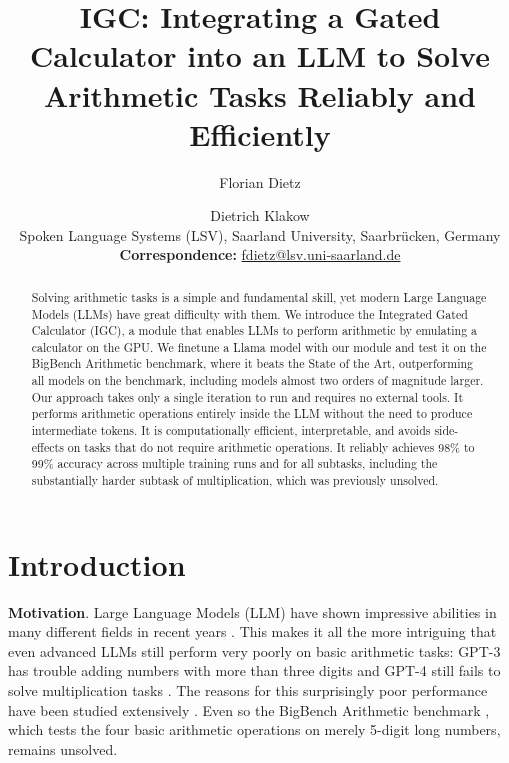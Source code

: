 \documentclass[11pt]{article}
\title{IGC: Integrating a Gated Calculator into an LLM to Solve Arithmetic Tasks Reliably and Efficiently}
\author{Florian Dietz \and Dietrich Klakow \\
  Spoken Language Systems (LSV), Saarland University, Saarbrücken, Germany \\
 \small{
   \textbf{Correspondence:} \href{mailto:fdietz@lsv.uni-saarland.de}{fdietz@lsv.uni-saarland.de}
 }
}
\begin{document}
\maketitle
{}
\begin{abstract}


Solving arithmetic tasks is a simple and fundamental skill, yet modern Large Language Models (LLMs) have great difficulty with them.
We introduce the Integrated Gated Calculator (IGC), a module that enables LLMs to perform arithmetic by emulating a calculator on the GPU.
We finetune a Llama model with our module and test it on the BigBench Arithmetic benchmark, where it beats the State of the Art, outperforming all models on the benchmark, including models almost two orders of magnitude larger.
Our approach takes only a single iteration to run and requires no external tools. It performs arithmetic operations entirely inside the LLM without the need to produce intermediate tokens. It is computationally efficient, interpretable, and avoids side-effects on tasks that do not require arithmetic operations.
It reliably achieves 98\% to 99\% accuracy across multiple training runs and for all subtasks, including the substantially harder subtask of multiplication, which was previously unsolved.



\end{abstract}



\section{Introduction}



\textbf{Motivation}.
Large Language Models (LLM) have shown impressive abilities in many different fields in recent years \citep{thoppilan2022lamda,chowdhery2023palm,brown2020language}.
This makes it all the more intriguing that even advanced LLMs still perform very poorly on basic arithmetic tasks:
GPT-3 has trouble adding numbers with more than three digits \citep{brown2020language} and GPT-4 \citep{achiam2023gpt} still fails to solve multiplication tasks \citep{dziri2024faith}.
The reasons for this surprisingly poor performance have been studied extensively \citep{yuan2023well,brown2020language,dziri2024faith}.
Even so the BigBench Arithmetic benchmark \citep{srivastava2023beyond}, which tests the four basic arithmetic operations on merely 5-digit long numbers, remains unsolved.
\end{document}
